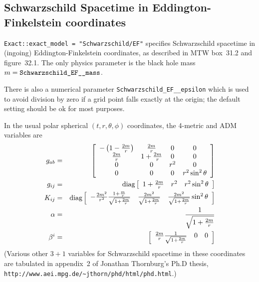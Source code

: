 
\subsection{Schwarzschild Spacetime in Eddington-Finkelstein coordinates}

\verb|Exact::exact_model = "Schwarzschild/EF"| specifies Schwarzschild
spacetime in (ingoing) Eddington-Finkelstein coordinates, as described
in MTW box~31.2 and figure~32.1.  The only physics parameter is
the black hole mass $m = \verb|Schwarzschild_EF__mass|$.

There is also a numerical parameter \verb|Schwarzschild_EF__epsilon|
which is used to avoid division by zero if a grid point falls exactly
at the origin; the default setting should be ok for most purposes.

In the usual polar spherical $(t,r,\theta,\phi)$ coordinates, the 4-metric
and ADM variables are
\begin{eqnarray}
g_{ab}	& = &
	\left[
	 \begin{array}{cccc}
	 - \left( 1 - \frac{2m}{r} \right)
			& \frac{2m}{r}	& 0	& 0	\\
	 \frac{2m}{r}	& 1 + \frac{2m}{r}
					& 0	& 0	\\
	 0		& 0		& r^2	& 0	\\
	 0		& 0		& 0	& r^2 \sin^2 \theta
	 \end{array}
	 \right]
									\\
g_{ij}	& = &
	\diag
	\left[
	\begin{array}{ccc}
	1 + \frac{2m}{r}	& r^2	& r^2 \sin^2 \theta	%
	\end{array}
	\right]
									\\
K_{ij}	& = &
	\diag
	\left[
	\begin{array}{ccc}
	- \frac{2m^2}{r^2} \frac {1 + \frac{m}{r}} {\sqrt{1 + \frac{2m}{r}}}
				& \frac{2m^2}{\sqrt{1 + \frac{2m}{r}}}
					& \frac{2m^2}{\sqrt{1 + \frac{2m}{r}}}
					  \sin^2 \theta		%
	\end{array}
	\right]
									\\
\alpha	& = &
	\frac{1}{\sqrt{1 + \frac{2m}{r}}}
									\\
\beta^i	& = &
	\left[
	\begin{array}{ccc}
	\frac{2m}{r} \frac{1}{\sqrt{1 + \frac{2m}{r}}}
				& 0	& 0			%
	\end{array}
	\right]
\end{eqnarray}
(Various other $3+1$ variables for Schwarzschild spacetime in these
coordinates are tabulated in appendix~2 of Jonathan Thornburg's Ph.D
thesis, \verb|http://www.aei.mpg.de/~jthorn/phd/html/phd.html|.)

